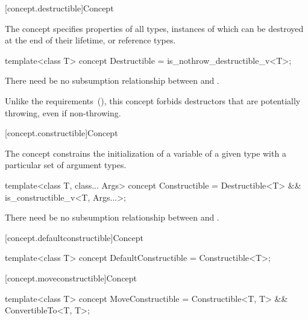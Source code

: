 [concept.destructible]{Concept }

\pnum
The  concept specifies properties of all types,
instances of which can be destroyed at the end of their lifetime, or reference
types.

%
\begin{itemdecl}
template<class T>
  concept Destructible = is_nothrow_destructible_v<T>;
\end{itemdecl}

\begin{itemdescr}
\pnum
There need be no subsumption relationship between
and
.

\pnum
\begin{note}
Unlike the  requirements~(), this
concept forbids destructors that are potentially throwing, even if non-throwing.
\end{note}
\end{itemdescr}

[concept.constructible]{Concept }

\pnum
The  concept constrains the initialization of a
variable of a given type with a particular set of argument types.

%
\begin{itemdecl}
template<class T, class... Args>
  concept Constructible = Destructible<T> && is_constructible_v<T, Args...>;
\end{itemdecl}

\begin{itemdescr}
\pnum
There need be no subsumption relationship between
and
.
\end{itemdescr}

[concept.defaultconstructible]{Concept }

%
\begin{itemdecl}
template<class T>
  concept DefaultConstructible = Constructible<T>;
\end{itemdecl}

[concept.moveconstructible]{Concept }

%
\begin{itemdecl}
template<class T>
  concept MoveConstructible = Constructible<T, T> && ConvertibleTo<T, T>;
\end{itemdecl}

